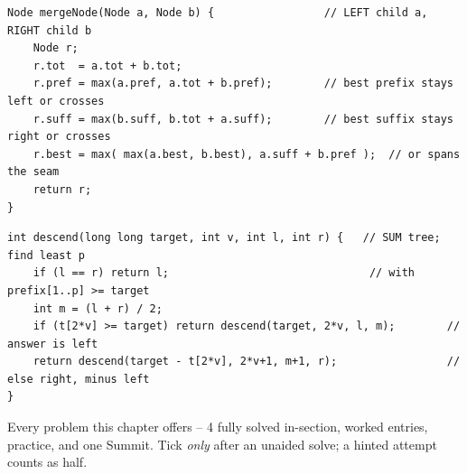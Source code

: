 \begin{lstlisting}[caption={Drill 4 -- max-subarray merge: the four-field combine (from lst:c13-combine)}]
Node mergeNode(Node a, Node b) {                 // LEFT child a, RIGHT child b
    Node r;
    r.tot  = a.tot + b.tot;
    r.pref = max(a.pref, a.tot + b.pref);        // best prefix stays left or crosses
    r.suff = max(b.suff, b.tot + a.suff);        // best suffix stays right or crosses
    r.best = max( max(a.best, b.best), a.suff + b.pref );  // or spans the seam
    return r;
}
\end{lstlisting}

\begin{lstlisting}[caption={Drill 5 -- descend to the first prefix >= target (from lst:c13-descend)}]
int descend(long long target, int v, int l, int r) {   // SUM tree; find least p
    if (l == r) return l;                               // with prefix[1..p] >= target
    int m = (l + r) / 2;
    if (t[2*v] >= target) return descend(target, 2*v, l, m);        // answer is left
    return descend(target - t[2*v], 2*v+1, m+1, r);                 // else right, minus left
}
\end{lstlisting}


Every problem this chapter offers -- 4 fully solved in-section, worked entries,
practice, and one Summit. Tick \emph{only} after an unaided solve; a hinted
attempt counts as half.

